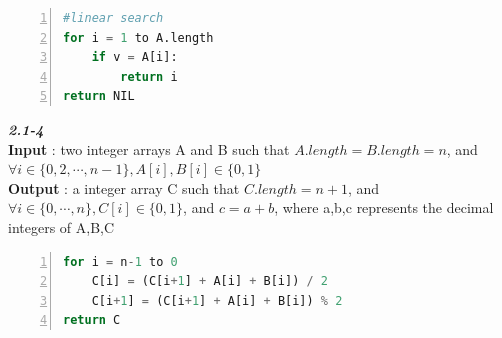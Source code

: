 \documentclass[Unicode]{article}
\begin{document}
\begin{lstlisting}[language=Python,numbers=left,numberstyle=\normalsize]
#linear search
for i = 1 to A.length
    if v = A[i]:
        return i
return NIL
\end{lstlisting}
\textbf{\textit{\Large{2.1-4}}}\\
\textbf{Input} : two integer arrays A and B such that $A.length=B.length=n$, and
$ \forall i \in \{0,2,\cdots,n-1\}, A[i],B[i] \in \{0,1\} $\\
\textbf{Output} : a integer array C such that $C.length=n+1$, and
$ \forall i \in \{0,\cdots,n\}, C[i]\in \{0,1\} $, and $c=a+b$, where a,b,c represents the decimal integers of A,B,C
\begin{lstlisting}[language=Python,numbers=left,numberstyle=\normalsize]
for i = n-1 to 0
    C[i] = (C[i+1] + A[i] + B[i]) / 2
    C[i+1] = (C[i+1] + A[i] + B[i]) % 2
return C
\end{lstlisting}
\end{document}

